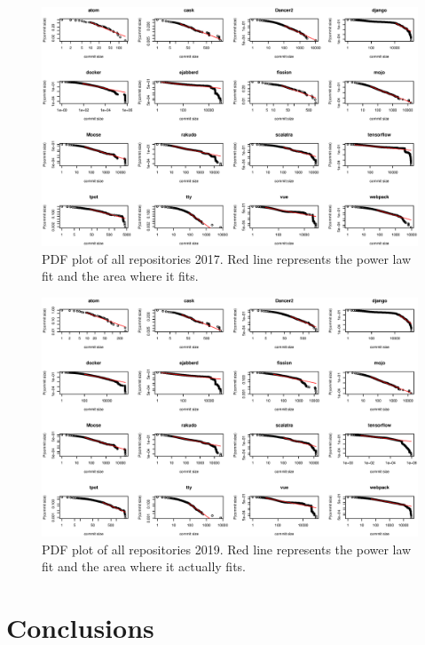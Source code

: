 \documentclass{article}
\begin{document}
\begin{figure}[htbp]
  \centerline{\includegraphics[width=1\textwidth]{plots/pl2017.eps}}
  \caption{PDF plot of all repositories 2017. Red line represents the
    power law fit and the area where it fits.}
  \label{fig:pl2017}
\end{figure}



\begin{figure}[htbp]
  \centerline{\includegraphics[width=1\textwidth]{plots/pl2019.eps}}
  \caption{PDF plot of all repositories 2019. Red line represents the
    power law fit and the area where it actually fits.}
  \label{fig:pl2019}
\end{figure}



\section{Conclusions}\label{conc}
\end{document}
